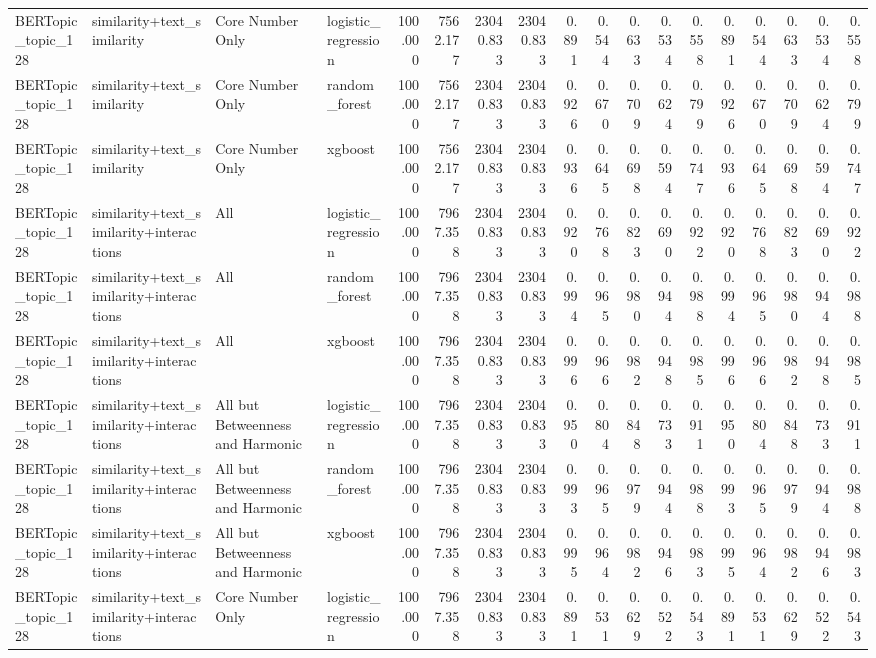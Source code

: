 \begin{tabular}{llllrrrrrrrrrrrrrr}
BERTopic\_topic\_128 & similarity+text\_similarity & Core Number Only & logistic\_regression & 100.000 & 7562.177 & 23040.833 & 23040.833 & 0.891 & 0.544 & 0.633 & 0.534 & 0.558 & 0.891 & 0.544 & 0.633 & 0.534 & 0.558 \\
BERTopic\_topic\_128 & similarity+text\_similarity & Core Number Only & random\_forest & 100.000 & 7562.177 & 23040.833 & 23040.833 & 0.926 & 0.670 & 0.709 & 0.624 & 0.799 & 0.926 & 0.670 & 0.709 & 0.624 & 0.799 \\
BERTopic\_topic\_128 & similarity+text\_similarity & Core Number Only & xgboost & 100.000 & 7562.177 & 23040.833 & 23040.833 & 0.936 & 0.645 & 0.698 & 0.594 & 0.747 & 0.936 & 0.645 & 0.698 & 0.594 & 0.747 \\
BERTopic\_topic\_128 & similarity+text\_similarity+interactions & All & logistic\_regression & 100.000 & 7967.358 & 23040.833 & 23040.833 & 0.920 & 0.768 & 0.823 & 0.690 & 0.922 & 0.920 & 0.768 & 0.823 & 0.690 & 0.922 \\
BERTopic\_topic\_128 & similarity+text\_similarity+interactions & All & random\_forest & 100.000 & 7967.358 & 23040.833 & 23040.833 & 0.994 & 0.965 & 0.980 & 0.944 & 0.988 & 0.994 & 0.965 & 0.980 & 0.944 & 0.988 \\
BERTopic\_topic\_128 & similarity+text\_similarity+interactions & All & xgboost & 100.000 & 7967.358 & 23040.833 & 23040.833 & 0.996 & 0.966 & 0.982 & 0.948 & 0.985 & 0.996 & 0.966 & 0.982 & 0.948 & 0.985 \\
BERTopic\_topic\_128 & similarity+text\_similarity+interactions & All but Betweenness and Harmonic & logistic\_regression & 100.000 & 7967.358 & 23040.833 & 23040.833 & 0.950 & 0.804 & 0.848 & 0.733 & 0.911 & 0.950 & 0.804 & 0.848 & 0.733 & 0.911 \\
BERTopic\_topic\_128 & similarity+text\_similarity+interactions & All but Betweenness and Harmonic & random\_forest & 100.000 & 7967.358 & 23040.833 & 23040.833 & 0.993 & 0.965 & 0.979 & 0.944 & 0.988 & 0.993 & 0.965 & 0.979 & 0.944 & 0.988 \\
BERTopic\_topic\_128 & similarity+text\_similarity+interactions & All but Betweenness and Harmonic & xgboost & 100.000 & 7967.358 & 23040.833 & 23040.833 & 0.995 & 0.964 & 0.982 & 0.946 & 0.983 & 0.995 & 0.964 & 0.982 & 0.946 & 0.983 \\
BERTopic\_topic\_128 & similarity+text\_similarity+interactions & Core Number Only & logistic\_regression & 100.000 & 7967.358 & 23040.833 & 23040.833 & 0.891 & 0.531 & 0.629 & 0.522 & 0.543 & 0.891 & 0.531 & 0.629 & 0.522 & 0.543 \\

\end{tabular}
